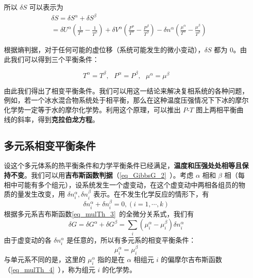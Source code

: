 所以 $\delta S$ 可以表示为
\begin{equation}
\begin{aligned}
&\delta S=\delta S^\alpha+\delta S^\beta\\&=\delta U^\alpha\left(\frac{1}{T^\alpha}-\frac{1}{T^\beta}\right)+\delta V^\alpha\left(\frac{P^\alpha}{T^\alpha}-\frac{P^\beta}{T^\beta}\right)
-\delta n^\alpha\left(\frac{\mu^\alpha}{T^\alpha}-\frac{\mu^\beta}{T^\beta}\right)
\end{aligned}
\end{equation}

根据熵判据，对于任何可能的虚位移（系统可能发生的微小变动），$\delta S$ 都为 $0$。由此我们可以得到三个平衡条件：

\begin{equation}\label{eq_PhEquv_3}
T^\alpha=T^\beta,\ \ \ P^\alpha=P^\beta,\ \ \ \mu^\alpha=\mu^\beta
\end{equation}

由此我们得出了相变平衡条件。我们可以用这一结论来解决复相系统的各种问题，例如，若一个冰水混合物系统处于相平衡，那么在这种温度压强情况下下冰的摩尔化学势一定等于水的摩尔化学势。利用这个原理，可以推出 $P$-$T$ 图上两相平衡曲线的斜率，得到\textbf{克拉伯龙方程}。

\subsection{多元系相变平衡条件}

设这个多元体系的热平衡条件和力学平衡条件已经满足，\textbf{温度和压强处处相等且保持不变}。我们可以用\textbf{吉布斯函数判据}（\autoref{eq_GibbsG_2}~）。考虑 $\alpha$ 相和 $\beta$ 相（每相中可能有多个组元），设系统发生一个虚变动，在这个虚变动中两相各组员的物质的量发生改变，用 $\delta n_i^\alpha,\delta n_i^\beta$ 表示。在不发生化学反应的情形下，有
\begin{equation}
\delta n_i^\alpha+\delta n_i^\beta=0,(i=1,\cdots,k)
\end{equation}
根据多元系吉布斯函数\autoref{eq_mulTh_3}~的全微分关系式，我们有
\begin{equation}
\delta G=\delta G^\alpha+\delta G^\beta=\sum_i (\mu_i^\alpha-\mu_i^\beta)\delta n_i^\alpha
\end{equation}
由于虚变动的各 $\delta n_i^\alpha$ 是任意的，所以有多元系的相变平衡条件：
\begin{equation}
\mu_i^\alpha=\mu_i^\beta
\end{equation}
与单元系不同的是，这里的 $\mu_i^\alpha$ 指的是在 $\alpha$ 相组元 $i$ 的偏摩尔吉布斯函数（\autoref{eq_mulTh_4}~），称为组元 $i$ 的化学势。

